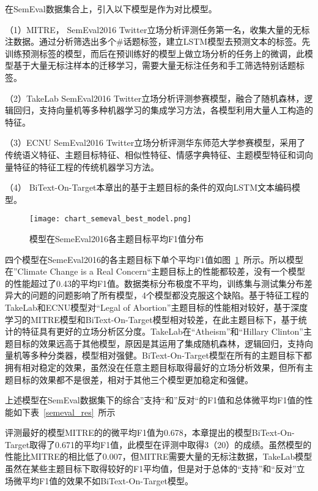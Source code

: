 在SemEval数据集合上，引入以下模型是作为对比模型。

（1）MITRE， SemEval2016 Twitter立场分析评测任务第一名，收集大量的无标注数据。通过分析筛选出多个\#话题标签，建立LSTM模型去预测文本的标签。先训练预测标签的模型，而后在预训练好的模型上做立场分析的任务上的微调，此模型基于大量无标注样本的迁移学习，需要大量无标注任务和手工筛选特别话题标签。

（2）TakeLab   SemEval2016 Twitter立场分析评测参赛模型，融合了随机森林，逻辑回归，支持向量机等多种机器学习的集成学习方法，各模型利用大量人工构造的特征。

（3）ECNU  SemEval2016 Twitter立场分析评测华东师范大学参赛模型，采用了传统语义特征、主题目标特征、相似性特征、情感字典特征、主题模型特征和词向量特征的特征工程的传统机器学习方法。

（4） BiText-On-Target本章出的基于主题目标的条件的双向LSTM文本编码模型。

\begin{figure}[htbp]
	\centering
	\texttt{[image: chart\_semeval\_best\_model.png]}
	\caption[rnn_vanish]{模型在SemeEval2016各主题目标平均F1值分布}
	\label{chart_semeval_best_model}
\end{figure}
四个模型在SemeEval2016的各主题目标下单个平均F1值如图~\ref{chart_semeval_best_model}~所示。所以模型在”Climate Change is a Real Concern“主题目标上的性能都较差，没有一个模型的性能超过了0.43的平均F1值。数据类标分布极度不平均，训练集与测试集分布差异大的问题的问题影响了所有模型，4个模型都没克服这个缺陷。基于特征工程的TakeLab和ECNU模型对“Legal of Abortion”主题目标的性能相对较好，基于深度学习的MITRE模型和BiText-On-Target模型相对较差，在此主题目标下，基于统计的特征具有更好的立场分析区分度。TakeLab在“Atheism”和“Hillary Clinton”主题目标的效果远高于其他模型，原因是其运用了集成随机森林，逻辑回归，支持向量机等多种分类器，模型相对强健。BiText-On-Target模型在所有的主题目标下都拥有相对稳定的效果，虽然没在任意主题目标取得最好的立场分析效果，但所有主题目标的效果都不是很差，相对于其他三个模型更加稳定和强健。

上述模型在SemEval数据集下的综合”支持“和”反对“的F1值和总体微平均F1值的性能如下表~\ref{semeval_res}~所示

评测最好的模型MITRE的的微平均F1值为0.678，本章提出的模型BiText-On-Target取得了0.671的平均F1值，此模型在评测中取得3（20）的成绩。虽然模型的性能比MITRE的相比低了0.007，但MITRE需要大量的无标注数据，TakeLab模型虽然在某些主题目标下取得较好的F1平均值，但是对于总体的“支持”和“反对”立场微平均F1值的效果不如BiText-On-Target模型。

